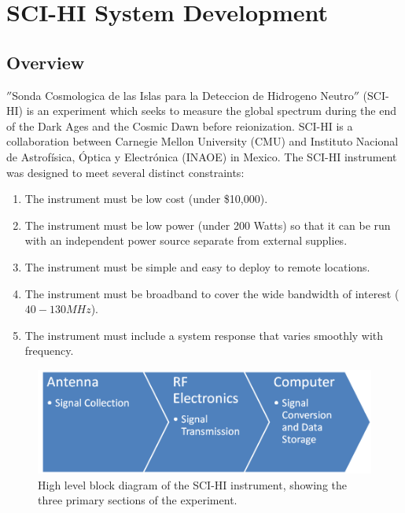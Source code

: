 \chapter{SCI-HI System Development}\label{Ch:System}



\section{Overview} \label{Sec:sysover}

$''$Sonda Cosmologica de las Islas para la Deteccion de Hidrogeno Neutro$''$ (SCI-HI) is an experiment which seeks to measure the \cm global spectrum during the end of the Dark Ages and the Cosmic Dawn before reionization. SCI-HI is a collaboration between Carnegie Mellon University (CMU) and Instituto Nacional de Astrof\'{i}sica, \'{O}ptica y Electr\'{o}nica (INAOE) in Mexico.  The SCI-HI instrument was designed to meet several distinct constraints:

\begin{enumerate}
\item The instrument must be low cost (under \$10,000).

\item The instrument must be low power (under  200 Watts) so that it can be run with an independent power source separate from external supplies. 

\item The instrument must be simple and easy to deploy to remote locations. 

\item The instrument must be broadband to cover the wide bandwidth of interest ($40-130 MHz$).

\item The instrument must include a system response that varies smoothly with frequency. 

\end{enumerate}

\begin{figure}[htb]
\begin{center}
\includegraphics[width=0.8\linewidth]{SCIHI_system/figures/basic_block_diagram.png}
\caption{High level block diagram of the SCI-HI instrument, showing the three primary sections of the experiment. }
\label{Fig:basic_block_diagram}
\end{center}
\end{figure}

